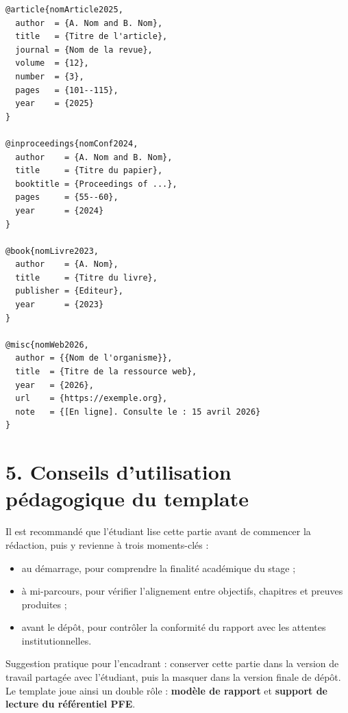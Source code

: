 \begin{lstlisting}[numbers=none]
@article{nomArticle2025,
  author  = {A. Nom and B. Nom},
  title   = {Titre de l'article},
  journal = {Nom de la revue},
  volume  = {12},
  number  = {3},
  pages   = {101--115},
  year    = {2025}
}

@inproceedings{nomConf2024,
  author    = {A. Nom and B. Nom},
  title     = {Titre du papier},
  booktitle = {Proceedings of ...},
  pages     = {55--60},
  year      = {2024}
}

@book{nomLivre2023,
  author    = {A. Nom},
  title     = {Titre du livre},
  publisher = {Editeur},
  year      = {2023}
}

@misc{nomWeb2026,
  author = {{Nom de l'organisme}},
  title  = {Titre de la ressource web},
  year   = {2026},
  url    = {https://exemple.org},
  note   = {[En ligne]. Consulte le : 15 avril 2026}
}
\end{lstlisting}


\section*{5. Conseils d'utilisation p\'edagogique du template}

Il est recommand\'e que l'\'etudiant lise cette partie avant de commencer la r\'edaction, puis y revienne \`a trois moments-cl\'es :

\begin{itemize}[leftmargin=1.2cm]
\item au d\'emarrage, pour comprendre la finalit\'e acad\'emique du stage ;
\item \`a mi-parcours, pour v\'erifier l'alignement entre objectifs, chapitres et preuves produites ;
\item avant le d\'ep\^ot, pour contr\^oler la conformit\'e du rapport avec les attentes institutionnelles.
\end{itemize}

\begin{guidebox}
Suggestion pratique pour l'encadrant : conserver cette partie dans la version de travail partag\'ee avec l'\'etudiant, puis la masquer dans la version finale de d\'ep\^ot. Le template joue ainsi un double r\^ole : \textbf{mod\`ele de rapport} et \textbf{support de lecture du r\'ef\'erentiel PFE}.
\end{guidebox}
